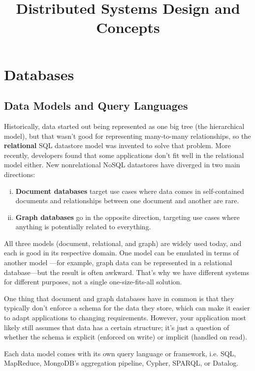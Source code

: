 \documentclass{article}
\title{\vspace{-3cm} Distributed Systems Design and Concepts}
\author{}
\date{}
\begin{document}
\maketitle
\vspace{-1.5cm}
\tableofcontents
\newpage

\section{Databases}
    \subsection{Data Models and Query Languages}
    Historically, data started out being represented as one big tree (the hierarchical model), but that wasn’t good for representing many-to-many relationships, so the \textbf{relational} SQL datastore model was invented to solve that problem. More recently, developers found that some applications don’t fit well in the relational model either. New nonrelational NoSQL datastores have diverged in two main directions:
    \begin{enumerate}[i.]
        \item \textbf{Document databases} target use cases where data comes in self-contained documents and relationships between one document and another are rare.
        \item \textbf{Graph databases} go in the opposite direction, targeting use cases where anything is potentially related to everything.
    \end{enumerate}
    
    All three models (document, relational, and graph) are widely used today, and each is good in its respective domain. One model can be emulated in terms of another model —for example, graph data can be represented in a relational database—but the result is often awkward. That’s why we have different systems for different purposes, not a single one-size-fits-all solution.
    
    One thing that document and graph databases have in common is that they typically don’t enforce a schema for the data they store, which can make it easier to adapt applications to changing requirements. However, your application most likely still assumes that data has a certain structure; it’s just a question of whether the schema is explicit (enforced on write) or implicit (handled on read).
    
    Each data model comes with its own query language or framework, i.e. SQL, MapReduce, MongoDB’s aggregation pipeline, Cypher, SPARQL, or Datalog. 
    
\end{document}
